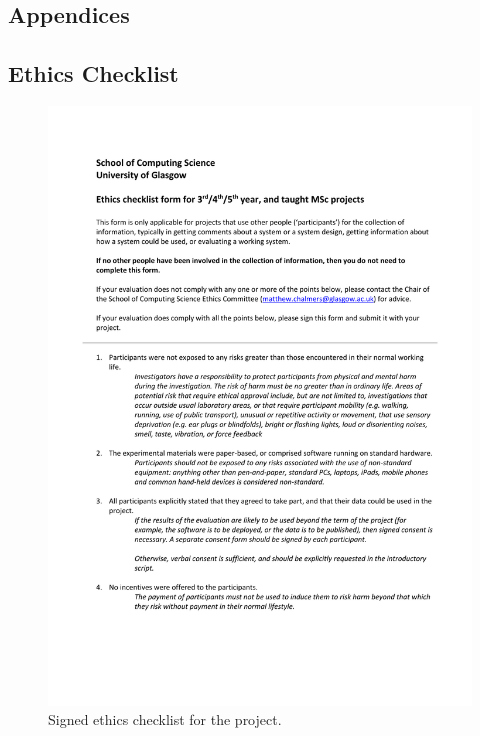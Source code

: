 \documentclass{l4proj}
\begin{document}
\begin{appendices}

\chapter{Appendices}

\section{Ethics Checklist}
\begin{figure}
    \centering
    \includegraphics{images/Ethics_Checklist.pdf}    

    \caption{Signed ethics checklist for the project.}

    \label{fig:ethics} 
\end{figure}


\end{appendices}






\end{document}
